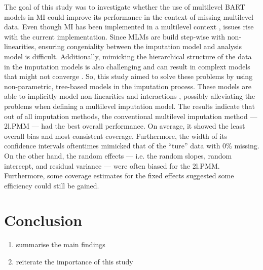 \documentclass[10pt, a4paper, titlepage]{article}
\begin{document}
The goal of this study was to investigate whether the use of multilevel BART models in MI could improve its performance in the context of missing multilevel data. Even though MI has been implemented in a multilevel context \citep{mistlerComparisonJointModel2017, enders2018, enders2018a, enders2020, buurenFlexibleImputationMissing2018, taljaard2008, enders2016, resche-rigon2018, audigier2018, dong2023, grund2016, grund2018a, grund2018, ludtke2017, grund2021, quartagno2022}, issues rise with the current implementation. Since MLMs are build step-wise with non-linearities, ensuring congeniality between the imputation model and analysis model is difficult. Additionally, mimicking the hierarchical structure of the data in the imputation models is also challenging \citep{buurenFlexibleImputationMissing2018, burgette2010, hox2011} and can result in complext models that might not converge \citep{buurenFlexibleImputationMissing2018}. So, this study aimed to solve these problems by using non-parametric, tree-based models in the imputation process. These models are able to implicitly model non-linearities and interactions \citep{hill2020, burgette2010, lin2019, chipman2010, james2021, salditt2023, breiman1984}, possibly alleviating the problems when defining a multilevel imputation model. 
The results indicate that out of all imputation methods, the conventional multilevel imputation method --- 2l.PMM --- had the best overall performance. On average, it showed the least overall bias and most consistent coverage. Furthermore, the width of its confidence intervals oftentimes mimicked that of the ``ture'' data with 0\% missing. On the other hand, the random effects --- i.e. the random slopes, random intercept, and residual variance --- were often biased for the 2l.PMM. Furthermore, some coverage estimates for the fixed effects suggested some efficiency could still be gained. 

\section{Conclusion}

\begin{enumerate}
    \item summarise the main findings
    \item reiterate the importance of this study
\end{enumerate}

\newpage
\end{document}
